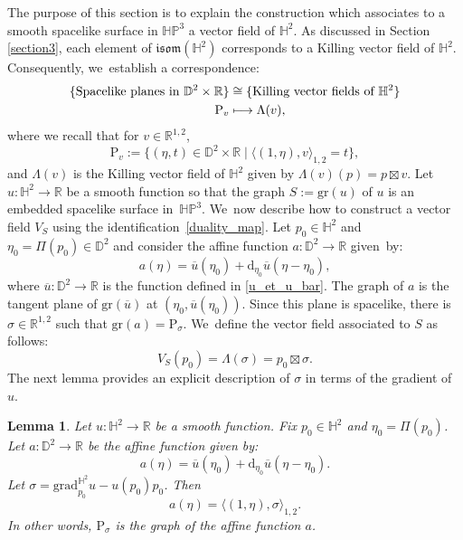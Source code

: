 \documentclass[10pt]{amsart}
\newcommand\mto{\mathchoice{\longmapsto}{\mapsto}{\mapsto}{\mapsto}}
\theoremstyle{plain}
\newtheorem{lemma}[cor]{Lemma}
\theoremstyle{definition}
\newcommand{\minko}{\mathbb{R}^{1,2}}
\newcommand{\HP}{\mathbb{HP}^3}
\newcommand{\grad}{\mathrm{grad}^{\mathbb{H}^2}}
\newcommand{\inner}[1] {\langle #1 \rangle}
\begin{document}
The purpose of this section is to explain the construction which associates to a smooth spacelike surface in $\HP$ a vector field of $\mathbb{H}^2$. As discussed in Section \ref{section3}, each element of $\mathfrak{isom}(\mathbb{H}^2)$ corresponds to a Killing vector field of $\mathbb{H}^2$. Consequently, we~establish a correspondence:
\begin{equation}\label{duality_map}
\begin{aligned}
\{\text{Spacelike planes in } \mathbb{D}^2\times\mathbb{R}\} & \cong \{\text{Killing vector fields of } \mathbb{H}^2\} \\
\mathrm{P}_v& \mto \Lambda(v),
\end{aligned}
\end{equation}
where we recall that for $v\in\minko$,
\[
\mathrm{P}_v:=\{(\eta,t)\in\mathbb{D}^2\times\mathbb{R} \mid \langle (1,\eta),v \rangle_{1,2}=t \},
\]
and $\Lambda(v)$ is the Killing vector field of $\mathbb{H}^2$ given by $\Lambda(v)(p)=p\boxtimes v$.
Let $u:\mathbb{H}^2\to \mathbb{R}$ be a smooth function so that the graph $S:=\mathrm{gr}(u)$ of $u$ is an embedded spacelike surface in~$\HP$. We~now describe how to construct a vector field $V_S$ using the identification~\eqref{duality_map}. Let $p_0\in\mathbb{H}^2$ and $\eta_0=\Pi(p_0)\in \mathbb{D}^2$ and consider the affine function $a:\mathbb{D}^2\to \mathbb{R}$ given~by:
\[
a(\eta)=\overline{u}(\eta_0)+\mathrm{d}_{\eta_0}\overline{u}(\eta-\eta_0),
\]
where $\overline{u}: \mathbb{D}^2 \to \mathbb{R}$ is the function defined in \eqref{u_et_u_bar}.
The graph of $a$ is the tangent plane of $\mathrm{gr}(\overline{u})$ at $(\eta_0,\overline{u}(\eta_0))$. Since this plane is spacelike, there is $\sigma\in\minko$ such that $\mathrm{gr}(a)=\mathrm{P}_{\sigma}$. We~define the vector field associated to $S$ as follows:
\begin{equation}\label{XS}
V_S(p_0)=\Lambda(\sigma)= p_0\boxtimes \sigma.
\end{equation}
The next lemma provides an explicit description of $\sigma$ in terms of the gradient of $u$.

\begin{lemma}\label{sigma_lemma}
Let $u:\mathbb{H}^2\to\mathbb{R}$ be a smooth function. Fix $p_0\in\mathbb{H}^2$ and $\eta_0=\Pi(p_0)$. Let $a:\mathbb{D}^2\to \mathbb{R}$ be the affine function given by:
\[
a(\eta)=\overline{u}(\eta_0)+\mathrm{d}_{\eta_0}\overline{u}(\eta-\eta_0).
\]
Let $\sigma=\grad_{p_0}u-u(p_0)p_0$. Then
\[
a(\eta)=\inner{(1,\eta),\sigma}_{1,2}.
\]
In other words, $\mathrm{P}_{\sigma}$ is the graph of the affine function $a$.
\end{lemma}
\end{document}
